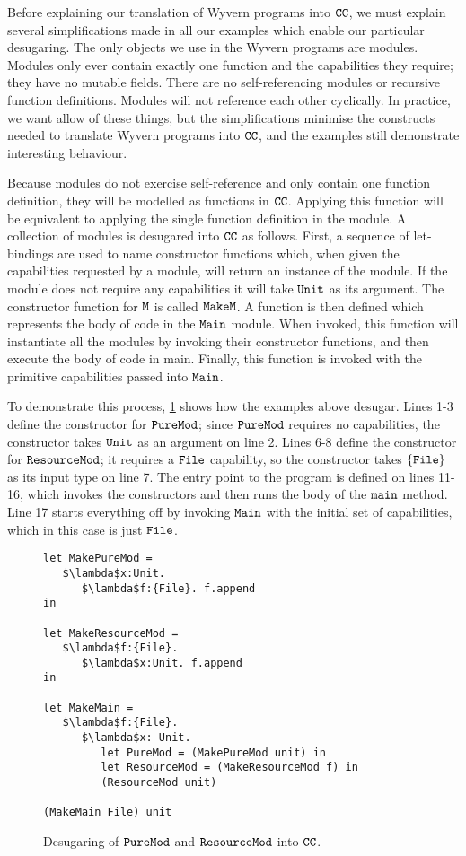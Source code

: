 Before explaining our translation of Wyvern programs into $\mathtt{CC}$, we must explain several simplifications made in all our examples which enable our particular desugaring. The only objects we use in the Wyvern programs are modules. Modules only ever contain exactly one function and the capabilities they require; they have no mutable fields. There are no self-referencing modules or recursive function definitions. Modules will not reference each other cyclically. In practice, we want allow of these things, but the simplifications minimise the constructs needed to translate Wyvern programs into $\mathtt{CC}$, and the examples still demonstrate interesting behaviour.

Because modules do not exercise self-reference and only contain one function definition, they will be modelled as functions in $\mathtt{CC}$. Applying this function will be equivalent to applying the single function definition in the module. A collection of modules is desugared into $\mathtt{CC}$ as follows. First, a sequence of let-bindings are used to name constructor functions which, when given the capabilities requested by a module, will return an instance of the module. If the module does not require any capabilities it will take $\mathtt{Unit}$ as its argument. The constructor function for $\mathtt{M}$ is called $\mathtt{MakeM}$. A function is then defined which represents the body of code in the $\mathtt{Main}$ module. When invoked, this function will instantiate all the modules by invoking their constructor functions, and then execute the body of code in main. Finally, this function is invoked with the primitive capabilities passed into $\mathtt{Main}$.

To demonstrate this process, \ref{fig:wyv_tutorial_desugaring} shows how the examples above desugar. Lines 1-3 define the constructor for $\mathtt{PureMod}$; since $\mathtt{PureMod}$ requires no capabilities, the constructor takes $\mathtt{Unit}$ as an argument on line 2. Lines 6-8 define the constructor for $\mathtt{ResourceMod}$; it requires a $\mathtt{File}$ capability, so the constructor takes $\mathtt{\{File\}}$ as its input type on line 7. The entry point to the program is defined on lines 11-16, which invokes the constructors and then runs the body of the $\mathtt{main}$ method. Line 17 starts everything off by invoking $\mathtt{Main}$ with the initial set of capabilities, which in this case is just $\mathtt{File}$.

\begin{figure}[h]

\begin{lstlisting}
let MakePureMod =
   $\lambda$x:Unit.
      $\lambda$f:{File}. f.append
in

let MakeResourceMod =
   $\lambda$f:{File}.
      $\lambda$x:Unit. f.append
in

let MakeMain =
   $\lambda$f:{File}.
      $\lambda$x: Unit.
         let PureMod = (MakePureMod unit) in
         let ResourceMod = (MakeResourceMod f) in
         (ResourceMod unit)

(MakeMain File) unit
\end{lstlisting}

\caption{Desugaring of $\mathtt{PureMod}$ and $\mathtt{ResourceMod}$ into $\mathtt{CC}$.}
\label{fig:wyv_tutorial_desugaring}
\end{figure}


